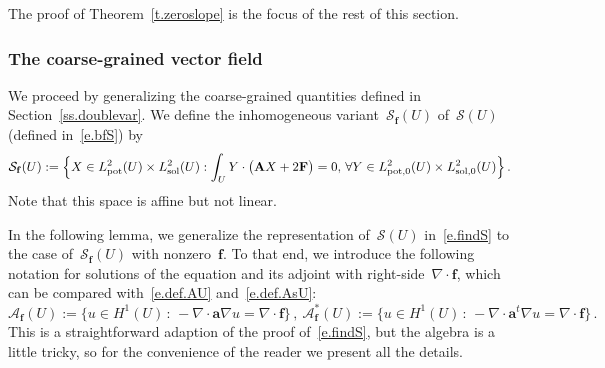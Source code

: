 \documentclass[11pt,twoside]{article} %
\numberwithin{equation}{section}
\theoremstyle{definition}
\newcommand{\f}{\mathbf{f}}
\renewcommand{\a}{\mathbf{a}}
\renewcommand{\S}{\mathcal{S}}
\newcommand{\Lsol}{L^2_{\mathrm{sol}}}
\newcommand{\Lsolo}{L^2_{\mathrm{sol,0}}}
\newcommand{\Lpot}{L^2_{\mathrm{pot}}}
\newcommand{\Lpoto}{L^2_{\mathrm{pot,0}}}
\newcommand{\bfA}{\mathbf{A}}
\newcommand{\bfF}{\mathbf{F}}
\begin{document}
The proof of Theorem~\ref{t.zeroslope} is the focus of the rest of this section.

\subsubsection{The coarse-grained vector field}

We proceed by generalizing the coarse-grained quantities defined in Section~\ref{ss.doublevar}. We define the inhomogeneous variant~$\S_{\f} (U)$ of~$\S(U)$ (defined in~\eqref{e.bfS}) by
\begin{align}
\label{e.Sf.this}
\S_{\f} (U) 
:=
\Bigl\{
X \in \Lpot(U) \times \Lsol(U) 
 : 
\int_U 
Y \cdot 
\bigl( \bfA X + 2 \bfF \bigr)
=0, \, 
\forall Y \in
\Lpoto(U) \times \Lsolo(U)
\Bigr\}
\,.
\end{align}
Note that this space is affine but not linear. 

In the following lemma, we generalize the representation of~$\S(U)$ in~\eqref{e.findS} to the case of~$\S_{\f}(U)$ with nonzero~$\f$.
To that end, we introduce the following notation for solutions of the equation and its adjoint with right-side~$\nabla\cdot \f$, which can be compared with~\eqref{e.def.AU} and~\eqref{e.def.AsU}:
\begin{equation*}
\mathcal{A}_{\f} (U) := 
\bigl\{ u \in H^1(U)\,:\, -\nabla\cdot \a\nabla u = \nabla \cdot \f \bigr\}\,, 
 \ 
\mathcal{A}_{\f}^* (U) := 
\bigl\{ u \in H^1(U)\,:\, -\nabla\cdot \a^t\nabla u = \nabla \cdot \f \bigr\}\,. 
\end{equation*}
This is a straightforward adaption of the proof of~\eqref{e.findS}, but the algebra is a little tricky, so for the convenience of the reader we present all the details. 
\end{document}
